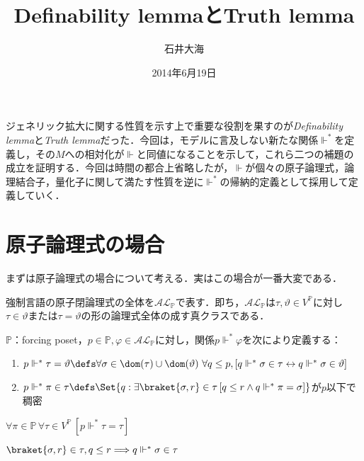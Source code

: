 \documentclass[a4j]{ltjsarticle}
\title{Definability lemmaとTruth lemma}
\author{石井大海}
\date{2014年6月19日}
\theoremstyle{definition}
\begin{document}
\maketitle
ジェネリック拡大に関する性質を示す上で重要な役割を果すのが\textit{Definability lemma}と\textit{Truth lemma}だった．今回は，モデルに言及しない新たな関係$\mathrel{\Vdash^*}$を定義し，その$M$への相対化が$\Vdash$と同値になることを示して，これら二つの補題の成立を証明する．今回は時間の都合上省略したが，$\Vdash$が個々の原子論理式，論理結合子，量化子に関して満たす性質を逆に$\mathrel{\Vdash^*}$の帰納的定義として採用して定義していく．

\section{原子論理式の場合}
まずは原子論理式の場合について考える．実はこの場合が一番大変である．

\begin{definition}
 強制言語の原子閉論理式の全体を$\mathcal{AL}_\mathbb{P}$で表す．即ち，$\mathcal{AL}_\mathbb{P}$は$\tau, \vartheta \in V^\mathbb{P}$に対し$\tau \in \vartheta$または$\tau = \vartheta$の形の論理式全体の成す真クラスである．
\end{definition}

\begin{definition}\label{def:force-atomic}
 $\mathbb{P}$：forcing poset，$p \in \mathbb{P}, \varphi \in \mathcal{AL}_\mathbb{P}$に対し，関係$p \mathrel{\Vdash^*} \varphi$を次により定義する：
 \begin{enumerate}
   \item $p \mathrel{\mathord\Vdash^*} \tau = \vartheta \defs \forall \sigma \in \dom(\tau) \cup \dom(\vartheta)\ \forall q \leq p ,[q \mathrel{\Vdash^*} \sigma \in \tau \leftrightarrow q \mathrel{\Vdash^*} \sigma \in \vartheta]$
  \item $p \mathrel{\Vdash^*} \pi \in \tau \defs \Set{ q : \exists \braket{\sigma, r} \in \tau \,[q \leq r \wedge q \mathrel{\Vdash^*} \pi = \sigma]}$が$p$以下で稠密
\end{enumerate}
\end{definition}

\begin{remark}\label{rem:q-forces-element}
 \begin{enumerate*}[label=(\alph*),itemjoin=\quad]
  \item $\forall \pi \in \mathbb{P}\,\forall \tau \in V^\mathbb{P} \, [p \mathrel{\Vdash^*} \tau = \tau]$
  \item $\braket{\sigma, r} \in \tau, q \leq r \Longrightarrow q \mathrel{\Vdash^*} \sigma \in \tau$
 \end{enumerate*}
\end{remark}
\end{document}
